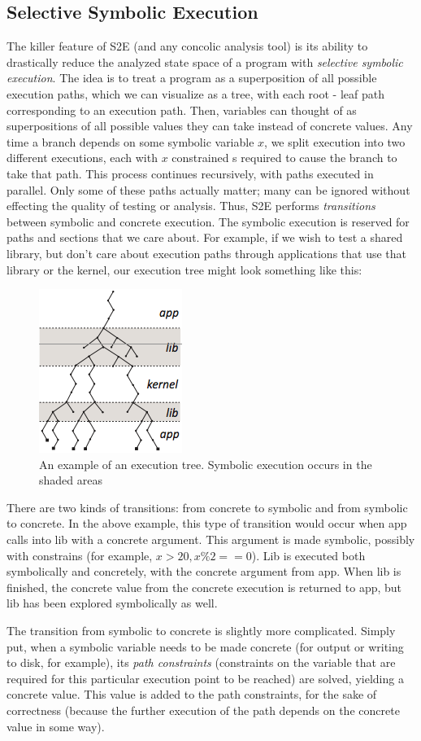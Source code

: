 \documentclass[11pt]{article}
\begin{document}
\subsection{Selective Symbolic Execution}
The killer feature of S2E (and any concolic analysis tool) is its ability to
drastically reduce the analyzed state space of a program with \textit{selective
symbolic execution}. The idea is to treat a program as a superposition of all
possible execution paths, which we can visualize as a tree, with each root -
leaf path corresponding to an execution path. Then, variables can thought of as
superpositions of all possible values they can take instead of concrete
values. Any time a branch depends on some symbolic variable $x$, we split
execution into two different executions, each with $x$ constrained s required to
cause the branch to take that path. This process continues recursively, with
paths executed in parallel. Only some of these paths actually matter; many can
be ignored without effecting the quality of testing or analysis. Thus, S2E
performs \textit{transitions} between symbolic and concrete execution. The
symbolic execution is reserved for paths and sections that we care about. For
example, if we wish to test a shared library, but don't care about execution
paths through applications that use that library or the kernel, our execution
tree might look something like this:
\begin{figure}[htp]
\centering
        \includegraphics{exec_tree}
\caption{An example of an execution tree. Symbolic execution occurs in the
shaded areas}
\end{figure}
\newpage
There are two kinds of transitions: from concrete to symbolic and from symbolic
to concrete. In the above example, this type of transition would occur when app
calls into lib with a concrete argument. This argument is made symbolic,
possibly with constrains (for example, $x > 20, x \% 2 == 0$). Lib is executed
both symbolically and concretely, with the concrete argument from app. When lib
is finished, the concrete value from the concrete execution is returned to app,
but lib has been explored symbolically as well. \par
The transition from symbolic to concrete is slightly more complicated. Simply
put, when a symbolic variable needs to be made concrete (for output or writing
to disk, for example), its \textit{path constraints} (constraints on the
variable that are required for this particular execution point to be reached)
are solved, yielding a concrete value. This value is added to the path
constraints, for the sake of correctness (because the further execution of the
path depends on the concrete value in some way). 
\end{document}
